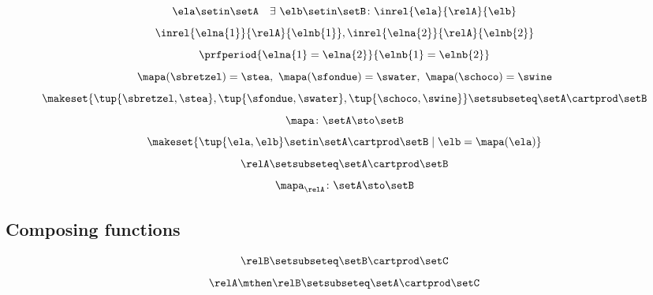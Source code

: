 {\begin{forslides}
        \begin{equation}
            \label{eq:slides_session2_rel_99}
            \ela \setin \setA \quad \exists \ \elb \setin \setB\colon  \inrel{\ela}{\relA}{\elb}
        \end{equation}
        \begin{equation}
            \label{eq:slides_session2_rel_100}
            \inrel{\elna{1}}{\relA}{\elnb{1}}, \inrel{\elna{2}}{\relA}{\elnb{2}}
        \end{equation}
        \begin{equation}
            \label{eq:slides_session2_rel_101}
            \prfperiod{\elna{1} = \elna{2}}{\elnb{1} = \elnb{2}}
        \end{equation}
        \begin{equation}
            \label{eq:slides_session2_rel_102}
            \mapa (\sbretzel) = \stea, \ \mapa (\sfondue) = \swater, \ \mapa(\schoco) = \swine
        \end{equation}
        \begin{equation}
            \label{eq:slides_session2_rel_103}
            \makeset{ \tup{\sbretzel, \stea}, \tup{\sfondue, \swater}, \tup{\schoco, \swine} } \setsubseteq \setA \cartprod \setB
        \end{equation}
        \begin{equation}
            \label{eq:slides_session2_rel_104}
            \mapa \colon \setA \sto \setB
        \end{equation}
        \begin{equation}
            \label{eq:slides_session2_rel_105}
            \makeset{ \tup{\ela,\elb} \setin \setA \cartprod \setB \mid \elb= \mapa(\ela) }
        \end{equation}
        \begin{equation}
            \label{eq:slides_session2_rel_106}
            \relA \setsubseteq \setA \cartprod \setB
        \end{equation}
        \begin{equation}
            \label{eq:slides_session2_rel_107}
            \mapa_{\relA} \colon \setA \sto \setB
        \end{equation}

        \subsection{Composing functions}

        \begin{equation}
            \label{eq:slides_session2_rel_108}
            \relB \setsubseteq \setB \cartprod \setC
        \end{equation}
        \begin{equation}
            \label{eq:slides_session2_rel_109}
            \relA \mthen \relB \setsubseteq \setA \cartprod \setC
        \end{equation}


\end{forslides}}
